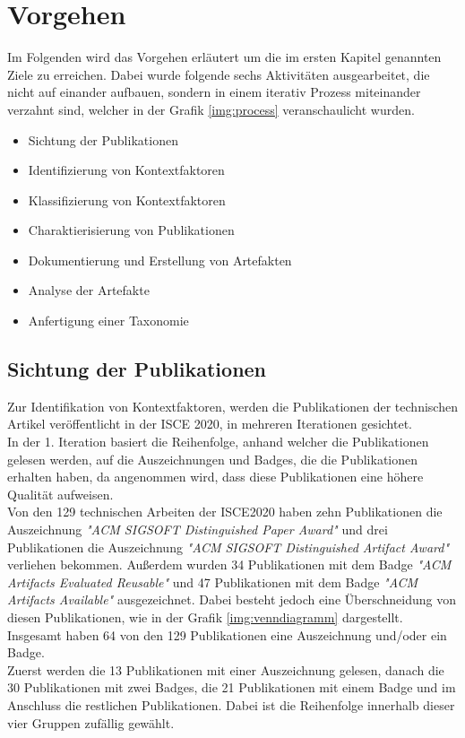 \chapter{Vorgehen}
\label{chapter:vorgehen}
Im Folgenden wird das Vorgehen erläutert um die im ersten Kapitel genannten Ziele zu erreichen. Dabei wurde folgende sechs Aktivitäten ausgearbeitet, die nicht auf einander aufbauen, sondern in einem iterativ Prozess miteinander verzahnt sind, welcher in der Grafik \ref{img:process} veranschaulicht wurden. \\

\begin{itemize}
    \item Sichtung der Publikationen
    \item Identifizierung von Kontextfaktoren
    \item Klassifizierung von Kontextfaktoren
    \item Charaktierisierung von Publikationen
    \item Dokumentierung und Erstellung von Artefakten
    \item Analyse der Artefakte
    \item Anfertigung einer Taxonomie
\end{itemize}

\section{Sichtung der Publikationen}
Zur Identifikation von Kontextfaktoren, werden die Publikationen der technischen Artikel veröffentlicht in der ISCE 2020, in mehreren Iterationen gesichtet. \\

In der 1. Iteration basiert die Reihenfolge, anhand welcher die Publikationen gelesen werden, auf die Auszeichnungen und Badges, die die Publikationen erhalten haben, da angenommen wird, dass diese Publikationen eine höhere Qualität aufweisen. \\
Von den 129 technischen Arbeiten der ISCE2020 haben zehn Publikationen die Auszeichnung \textit{"ACM SIGSOFT Distinguished Paper Award"} und drei Publikationen die Auszeichnung \textit{"ACM SIGSOFT Distinguished Artifact Award"} verliehen bekommen. Außerdem wurden 34 Publikationen mit dem Badge \textit{"ACM Artifacts Evaluated Reusable"} und 47 Publikationen mit dem Badge \textit{"ACM Artifacts Available"} ausgezeichnet. Dabei besteht jedoch eine Überschneidung von diesen Publikationen, wie in der Grafik \ref{img:venndiagramm} dargestellt. Insgesamt haben 64 von den 129 Publikationen eine Auszeichnung und/oder ein Badge. \\
Zuerst werden die 13 Publikationen mit einer Auszeichnung gelesen, danach die 30 Publikationen mit zwei Badges, die 21 Publikationen mit einem Badge und im Anschluss die restlichen Publikationen. Dabei ist die Reihenfolge innerhalb dieser vier Gruppen zufällig gewählt. \\

